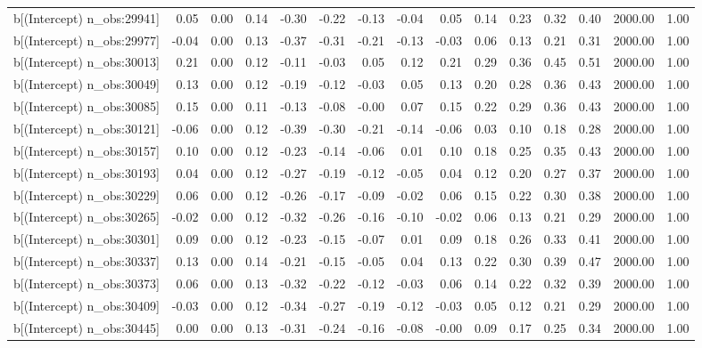 \begin{table}[ht]
\begin{tabular}{rrrrrrrrrrrrrrr}
  b[(Intercept) n\_obs:29941] & 0.05 & 0.00 & 0.14 & -0.30 & -0.22 & -0.13 & -0.04 & 0.05 & 0.14 & 0.23 & 0.32 & 0.40 & 2000.00 & 1.00 \\ 
  b[(Intercept) n\_obs:29977] & -0.04 & 0.00 & 0.13 & -0.37 & -0.31 & -0.21 & -0.13 & -0.03 & 0.06 & 0.13 & 0.21 & 0.31 & 2000.00 & 1.00 \\ 
  b[(Intercept) n\_obs:30013] & 0.21 & 0.00 & 0.12 & -0.11 & -0.03 & 0.05 & 0.12 & 0.21 & 0.29 & 0.36 & 0.45 & 0.51 & 2000.00 & 1.00 \\ 
  b[(Intercept) n\_obs:30049] & 0.13 & 0.00 & 0.12 & -0.19 & -0.12 & -0.03 & 0.05 & 0.13 & 0.20 & 0.28 & 0.36 & 0.43 & 2000.00 & 1.00 \\ 
  b[(Intercept) n\_obs:30085] & 0.15 & 0.00 & 0.11 & -0.13 & -0.08 & -0.00 & 0.07 & 0.15 & 0.22 & 0.29 & 0.36 & 0.43 & 2000.00 & 1.00 \\ 
  b[(Intercept) n\_obs:30121] & -0.06 & 0.00 & 0.12 & -0.39 & -0.30 & -0.21 & -0.14 & -0.06 & 0.03 & 0.10 & 0.18 & 0.28 & 2000.00 & 1.00 \\ 
  b[(Intercept) n\_obs:30157] & 0.10 & 0.00 & 0.12 & -0.23 & -0.14 & -0.06 & 0.01 & 0.10 & 0.18 & 0.25 & 0.35 & 0.43 & 2000.00 & 1.00 \\ 
  b[(Intercept) n\_obs:30193] & 0.04 & 0.00 & 0.12 & -0.27 & -0.19 & -0.12 & -0.05 & 0.04 & 0.12 & 0.20 & 0.27 & 0.37 & 2000.00 & 1.00 \\ 
  b[(Intercept) n\_obs:30229] & 0.06 & 0.00 & 0.12 & -0.26 & -0.17 & -0.09 & -0.02 & 0.06 & 0.15 & 0.22 & 0.30 & 0.38 & 2000.00 & 1.00 \\ 
  b[(Intercept) n\_obs:30265] & -0.02 & 0.00 & 0.12 & -0.32 & -0.26 & -0.16 & -0.10 & -0.02 & 0.06 & 0.13 & 0.21 & 0.29 & 2000.00 & 1.00 \\ 
  b[(Intercept) n\_obs:30301] & 0.09 & 0.00 & 0.12 & -0.23 & -0.15 & -0.07 & 0.01 & 0.09 & 0.18 & 0.26 & 0.33 & 0.41 & 2000.00 & 1.00 \\ 
  b[(Intercept) n\_obs:30337] & 0.13 & 0.00 & 0.14 & -0.21 & -0.15 & -0.05 & 0.04 & 0.13 & 0.22 & 0.30 & 0.39 & 0.47 & 2000.00 & 1.00 \\ 
  b[(Intercept) n\_obs:30373] & 0.06 & 0.00 & 0.13 & -0.32 & -0.22 & -0.12 & -0.03 & 0.06 & 0.14 & 0.22 & 0.32 & 0.39 & 2000.00 & 1.00 \\ 
  b[(Intercept) n\_obs:30409] & -0.03 & 0.00 & 0.12 & -0.34 & -0.27 & -0.19 & -0.12 & -0.03 & 0.05 & 0.12 & 0.21 & 0.29 & 2000.00 & 1.00 \\ 
  b[(Intercept) n\_obs:30445] & 0.00 & 0.00 & 0.13 & -0.31 & -0.24 & -0.16 & -0.08 & -0.00 & 0.09 & 0.17 & 0.25 & 0.34 & 2000.00 & 1.00 \\ 

\end{tabular}
\end{table}
